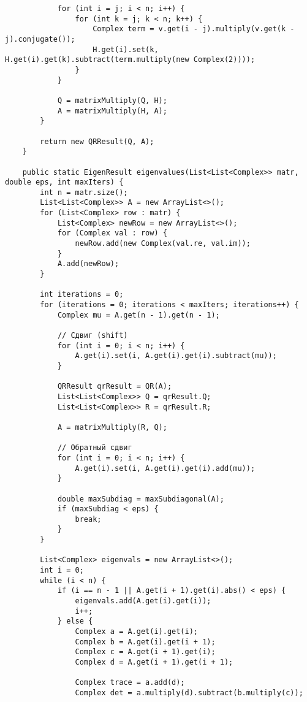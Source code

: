 \begin{verbatim}
            for (int i = j; i < n; i++) {
                for (int k = j; k < n; k++) {
                    Complex term = v.get(i - j).multiply(v.get(k - j).conjugate());
                    H.get(i).set(k, H.get(i).get(k).subtract(term.multiply(new Complex(2))));
                }
            }

            Q = matrixMultiply(Q, H);
            A = matrixMultiply(H, A);
        }

        return new QRResult(Q, A);
    }

    public static EigenResult eigenvalues(List<List<Complex>> matr, double eps, int maxIters) {
        int n = matr.size();
        List<List<Complex>> A = new ArrayList<>();
        for (List<Complex> row : matr) {
            List<Complex> newRow = new ArrayList<>();
            for (Complex val : row) {
                newRow.add(new Complex(val.re, val.im));
            }
            A.add(newRow);
        }

        int iterations = 0;
        for (iterations = 0; iterations < maxIters; iterations++) {
            Complex mu = A.get(n - 1).get(n - 1);

            // Сдвиг (shift)
            for (int i = 0; i < n; i++) {
                A.get(i).set(i, A.get(i).get(i).subtract(mu));
            }

            QRResult qrResult = QR(A);
            List<List<Complex>> Q = qrResult.Q;
            List<List<Complex>> R = qrResult.R;

            A = matrixMultiply(R, Q);

            // Обратный сдвиг
            for (int i = 0; i < n; i++) {
                A.get(i).set(i, A.get(i).get(i).add(mu));
            }

            double maxSubdiag = maxSubdiagonal(A);
            if (maxSubdiag < eps) {
                break;
            }
        }

        List<Complex> eigenvals = new ArrayList<>();
        int i = 0;
        while (i < n) {
            if (i == n - 1 || A.get(i + 1).get(i).abs() < eps) {
                eigenvals.add(A.get(i).get(i));
                i++;
            } else {
                Complex a = A.get(i).get(i);
                Complex b = A.get(i).get(i + 1);
                Complex c = A.get(i + 1).get(i);
                Complex d = A.get(i + 1).get(i + 1);

                Complex trace = a.add(d);
                Complex det = a.multiply(d).subtract(b.multiply(c));


\end{verbatim}
